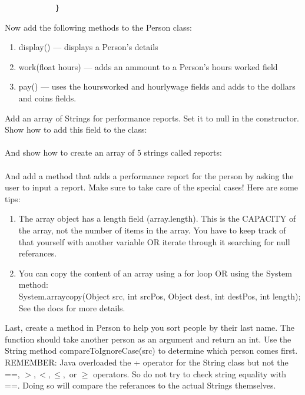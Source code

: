 \documentclass[../../main.tex]{subfiles}
\begin{document}
\begin{steps}
      \begin{verbatim}
            }
      \end{verbatim}
      \item Now add the following methods to the Person class:
         \begin{enumerate}[label=\Alph*.]
            \item display() --- displays a Person's details
            \item work(float hours) --- adds an ammount to a Person's hours\textunderscore
               worked field
            \item pay() --- uses the hours\textunderscore worked and hourly\textunderscore wage
               fields and adds to the dollars and coins fields.
         \end{enumerate}
      \item Add an array of Strings for performance reports.  Set it to null in the constructor.
         Show how to add this field to the class:
         \vspace{.5cm}\\
         \underline{\hspace{15cm}}\\
         And show how to create an array of 5 strings called reports:
         \vspace{.5cm}\\
         \underline{\hspace{15cm}}\\
         And add a method that adds a performance report for the person by asking the user to
         input a report. Make sure to take care of the special cases! Here are some tips:
         \begin{enumerate}[label=\Alph*.]
            \item The array object has a length field (array.length). This is the CAPACITY
               of the array, not the number of items in the array. You have to keep track
               of that yourself with another variable OR iterate through it searching for
               null referances.
            \item You can copy the content of an array using a for loop OR using the System
               method:\\
               System.arraycopy(Object src, int srcPos, Object dest, int destPos, int length);\\
               See the docs for more details.
         \end{enumerate} 
      \item Last, create a method in Person to help you sort people by their last name.
         The function should take another person as an argument and return an int.
         Use the String method
         compareToIgnoreCase(src) to determine which person comes first.\\
            REMEMBER: Java overloaded the + operator for the String class but not the ==,
            $>, <, \leq,$ or $\geq$ operators. So do not try to check string equality with ==.
            Doing so will compare the referances to the actual Strings themselves.
   \end{steps}
   
\end{document}

